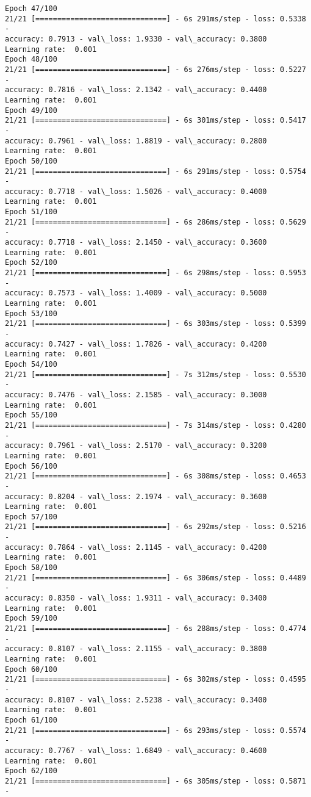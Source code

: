 \documentclass[11pt]{article}
\begin{document}
\begin{Verbatim}[commandchars=\\\{\}]
Epoch 47/100
21/21 [==============================] - 6s 291ms/step - loss: 0.5338 -
accuracy: 0.7913 - val\_loss: 1.9330 - val\_accuracy: 0.3800
Learning rate:  0.001
Epoch 48/100
21/21 [==============================] - 6s 276ms/step - loss: 0.5227 -
accuracy: 0.7816 - val\_loss: 2.1342 - val\_accuracy: 0.4400
Learning rate:  0.001
Epoch 49/100
21/21 [==============================] - 6s 301ms/step - loss: 0.5417 -
accuracy: 0.7961 - val\_loss: 1.8819 - val\_accuracy: 0.2800
Learning rate:  0.001
Epoch 50/100
21/21 [==============================] - 6s 291ms/step - loss: 0.5754 -
accuracy: 0.7718 - val\_loss: 1.5026 - val\_accuracy: 0.4000
Learning rate:  0.001
Epoch 51/100
21/21 [==============================] - 6s 286ms/step - loss: 0.5629 -
accuracy: 0.7718 - val\_loss: 2.1450 - val\_accuracy: 0.3600
Learning rate:  0.001
Epoch 52/100
21/21 [==============================] - 6s 298ms/step - loss: 0.5953 -
accuracy: 0.7573 - val\_loss: 1.4009 - val\_accuracy: 0.5000
Learning rate:  0.001
Epoch 53/100
21/21 [==============================] - 6s 303ms/step - loss: 0.5399 -
accuracy: 0.7427 - val\_loss: 1.7826 - val\_accuracy: 0.4200
Learning rate:  0.001
Epoch 54/100
21/21 [==============================] - 7s 312ms/step - loss: 0.5530 -
accuracy: 0.7476 - val\_loss: 2.1585 - val\_accuracy: 0.3000
Learning rate:  0.001
Epoch 55/100
21/21 [==============================] - 7s 314ms/step - loss: 0.4280 -
accuracy: 0.7961 - val\_loss: 2.5170 - val\_accuracy: 0.3200
Learning rate:  0.001
Epoch 56/100
21/21 [==============================] - 6s 308ms/step - loss: 0.4653 -
accuracy: 0.8204 - val\_loss: 2.1974 - val\_accuracy: 0.3600
Learning rate:  0.001
Epoch 57/100
21/21 [==============================] - 6s 292ms/step - loss: 0.5216 -
accuracy: 0.7864 - val\_loss: 2.1145 - val\_accuracy: 0.4200
Learning rate:  0.001
Epoch 58/100
21/21 [==============================] - 6s 306ms/step - loss: 0.4489 -
accuracy: 0.8350 - val\_loss: 1.9311 - val\_accuracy: 0.3400
Learning rate:  0.001
Epoch 59/100
21/21 [==============================] - 6s 288ms/step - loss: 0.4774 -
accuracy: 0.8107 - val\_loss: 2.1155 - val\_accuracy: 0.3800
Learning rate:  0.001
Epoch 60/100
21/21 [==============================] - 6s 302ms/step - loss: 0.4595 -
accuracy: 0.8107 - val\_loss: 2.5238 - val\_accuracy: 0.3400
Learning rate:  0.001
Epoch 61/100
21/21 [==============================] - 6s 293ms/step - loss: 0.5574 -
accuracy: 0.7767 - val\_loss: 1.6849 - val\_accuracy: 0.4600
Learning rate:  0.001
Epoch 62/100
21/21 [==============================] - 6s 305ms/step - loss: 0.5871 -

\end{Verbatim}
\end{document}
